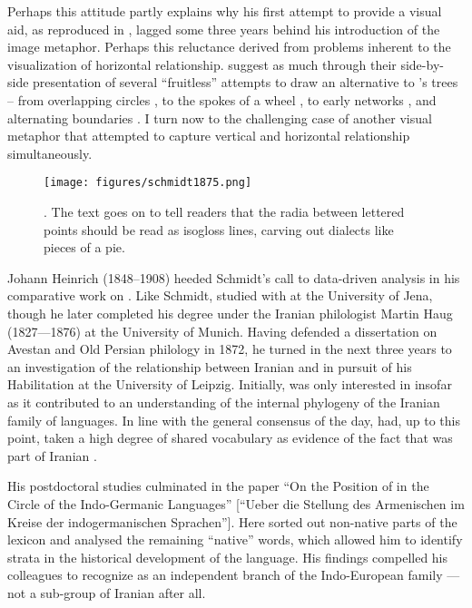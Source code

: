 \documentclass[output=paper]{langscibook}
\begin{document}
Perhaps this attitude partly explains why his first attempt to provide a visual aid, as reproduced in , lagged some three years behind his introduction of the image metaphor. Perhaps this reluctance derived from problems inherent to the visualization of horizontal relationship. \citet[116--117]{GeislerList2013} suggest as much through their side-by-side presentation of several ``fruitless'' attempts to draw an alternative to {\Schleicher}'s trees -- from overlapping circles \citep{Hirt1905}, to the spokes of a wheel \citep{Meillet1908}, to early networks \citep{bonfante1931}, and alternating boundaries \citep{Bloomfield1933}. I turn now to the challenging case of another visual metaphor that attempted to capture vertical and horizontal relationship simultaneously.

\begin{figure}
    \centering
    \texttt{[image: figures/schmidt1875.png]}
    \caption{\citet[199]{Schmidt1875}. The text goes on to tell readers that the radia between lettered points should be read as isogloss lines, carving out dialects like pieces of a pie.}
    \label{fig:kaplan:schmidt}
\end{figure}

Johann Heinrich {} (1848--1908) heeded Schmidt's call to data-driv\-en analysis in his comparative work on {\Armenian}. Like Schmidt, {} studied with {\Schleicher} at the University of Jena, though he later completed his degree under the Iranian philologist Martin Haug (1827—1876) at the University of Munich. Having defended a dissertation on Avestan and Old Persian philology in 1872, he turned in the next three years to an investigation of the relationship between Iranian and {\Armenian} in pursuit of his Habilitation at the University of Leipzig. Initially, {} was only interested in {\Armenian} insofar as it contributed to an understanding of the internal phylogeny of the Iranian family of languages. In line with the general consensus of the day, {} had, up to this point, taken a high degree of shared vocabulary as evidence of the fact that {\Armenian} was part of Iranian \citep{Schmitt1976}.

His postdoctoral studies culminated in the \citeyear{Huebschmann1875} paper ``On the Position of {\Armenian} in the Circle of the Indo-Germanic Languages'' [``Ueber die Stellung des Armenischen im Kreise der indogermanischen Sprachen'']. Here {} sorted out non-native parts of the lexicon and analysed the remaining ``native'' words, which allowed him to identify strata in the historical development of the language. His findings compelled his colleagues to recognize {\Armenian} as an independent branch of the Indo-European family — not a sub-group of Iranian after all.
\end{document}

